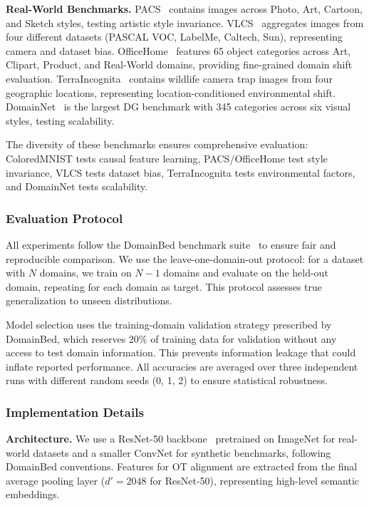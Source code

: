 \documentclass[preprint,12pt]{elsarticle}
\begin{document}
\textbf{Real-World Benchmarks.} PACS~\citep{li2017deeper} contains images across Photo, Art, Cartoon, and Sketch styles, testing artistic style invariance. VLCS~\citep{fang2013unbiased} aggregates images from four different datasets (PASCAL VOC, LabelMe, Caltech, Sun), representing camera and dataset bias. OfficeHome~\citep{venkateswara2017deep} features 65 object categories across Art, Clipart, Product, and Real-World domains, providing fine-grained domain shift evaluation. TerraIncognita~\citep{beery2018recognition} contains wildlife camera trap images from four geographic locations, representing location-conditioned environmental shift. DomainNet~\citep{peng2019moment} is the largest DG benchmark with 345 categories across six visual styles, testing scalability.

The diversity of these benchmarks ensures comprehensive evaluation: ColoredMNIST tests causal feature learning, PACS/OfficeHome test style invariance, VLCS tests dataset bias, TerraIncognita tests environmental factors, and DomainNet tests scalability.

\subsubsection{Evaluation Protocol}

All experiments follow the DomainBed benchmark suite~\citep{gulrajani2020search} to ensure fair and reproducible comparison. We use the leave-one-domain-out protocol: for a dataset with $N$ domains, we train on $N-1$ domains and evaluate on the held-out domain, repeating for each domain as target. This protocol assesses true generalization to unseen distributions.

Model selection uses the training-domain validation strategy prescribed by DomainBed, which reserves 20\% of training data for validation without any access to test domain information. This prevents information leakage that could inflate reported performance. All accuracies are averaged over three independent runs with different random seeds (0, 1, 2) to ensure statistical robustness.

\subsubsection{Implementation Details}

\textbf{Architecture.} We use a ResNet-50 backbone~\citep{he2016deep} pretrained on ImageNet for real-world datasets and a smaller ConvNet for synthetic benchmarks, following DomainBed conventions. Features for OT alignment are extracted from the final average pooling layer ($d' = 2048$ for ResNet-50), representing high-level semantic embeddings.
\end{document}
